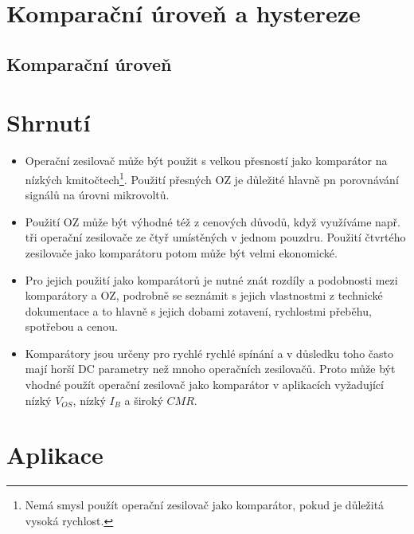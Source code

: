     \section{Komparační úroveň a hystereze}
      \subsection{Komparační úroveň}
        
    \section{Shrnutí}
      \begin{itemize}[noitemsep]
        \item Operační zesilovač může být použit s velkou přesností jako komparátor na nízkých
              kmitočtech\footnote{Nemá smysl použít operační zesilovač jako komparátor, pokud je
              důležitá vysoká rychlost.}. Použití přesných OZ je důležité hlavně pn porovnávání
              signálů na úrovni mikrovoltů.
        \item Použití OZ může být výhodné též z cenových důvodů, když využíváme např. tři operační
              zesilovače ze čtyř umístěných v jednom pouzdru. Použití čtvrtého zesilovače jako
              komparátoru potom může být velmi ekonomické. 
        \item Pro jejich použití jako komparátorů je nutné znát rozdíly a podobnosti mezi
              komparátory a OZ, podrobně se seznámit s jejich vlastnostmi z technické dokumentace
              a to hlavně s jejich dobami zotavení, rychlostmi přeběhu, spotřebou a cenou.
        \item Komparátory jsou určeny pro rychlé rychlé spínání a v důsledku toho často mají horší
              DC parametry než mnoho operačních zesilovačů. Proto může být vhodné použít operační
              zesilovač jako komparátor v aplikacích vyžadující nízký \(V_{OS}\), nízký \(I_B\) a
              široký \(CMR\).
      \end{itemize}        

  
  \section{Aplikace}  


